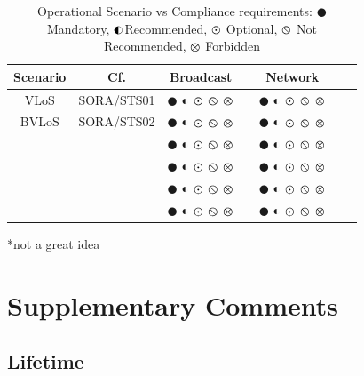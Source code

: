 \documentclass{ua_wgs_base}
\begin{document}
\begin{table}[tbh]
\begin{centering}
\begin{tabular}{|c|c|c|c|c|c|c|}
\hline 
Scenario & Cf. & Broadcast &  & Network &  & \tabularnewline
\hline 
\hline 
VLoS & SORA/STS01 & $\CIRCLE$ $\LEFTcircle$ $\varodot$ $\varobslash$ $\varotimes$ &  & $\CIRCLE$ $\LEFTcircle$ $\varodot$ $\varobslash$ $\varotimes$ &  & \tabularnewline
\hline 
BVLoS & SORA/STS02 & $\CIRCLE$ $\LEFTcircle$ $\varodot$ $\varobslash$ $\varotimes$ &  & $\CIRCLE$ $\LEFTcircle$ $\varodot$ $\varobslash$ $\varotimes$ &  & \tabularnewline
\hline 
 &  & $\CIRCLE$ $\LEFTcircle$ $\varodot$ $\varobslash$ $\varotimes$ &  & $\CIRCLE$ $\LEFTcircle$ $\varodot$ $\varobslash$ $\varotimes$ &  & \tabularnewline
\hline 
 &  & $\CIRCLE$ $\LEFTcircle$ $\varodot$ $\varobslash$ $\varotimes$ &  & $\CIRCLE$ $\LEFTcircle$ $\varodot$ $\varobslash$ $\varotimes$ &  & \tabularnewline
\hline 
 &  & $\CIRCLE$ $\LEFTcircle$ $\varodot$ $\varobslash$ $\varotimes$ &  & $\CIRCLE$ $\LEFTcircle$ $\varodot$ $\varobslash$ $\varotimes$ &  & \tabularnewline
\hline 
 &  & $\CIRCLE$ $\LEFTcircle$ $\varodot$ $\varobslash$ $\varotimes$ &  & $\CIRCLE$ $\LEFTcircle$ $\varodot$ $\varobslash$ $\varotimes$ &  & \tabularnewline
\hline 
\end{tabular}
\par\end{centering}
\begin{centering}
\begin{lyxgreyedout}
\begin{center}
{*}not a great idea
\par\end{center}%
\end{lyxgreyedout}
\par\end{centering}
\caption{Operational Scenario vs Compliance requirements: $\CIRCLE$ Mandatory,
$\protect\LEFTcircle$Recommended, $\varodot$ Optional, $\varobslash$
Not Recommended, $\varotimes$ Forbidden}
\end{table}


\section{Supplementary Comments}

\subsection{Lifetime\label{subsec:Lifetime}}
\end{document}
